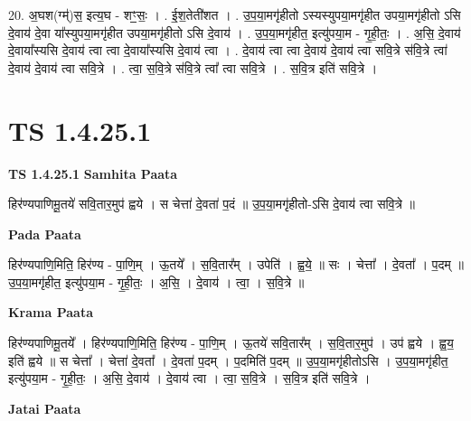 \documentclass[17pt]{extarticle}
\begin{document}
20. अ॒घश(ग्म्॑)स॒ इत्य॒घ - शꣳ॒॒सः॒ । . ई॒श॒तेती॑शत । . उ॒प॒या॒मगृ॑हीतो ऽस्यस्युपया॒मगृ॑हीत उपया॒मगृ॑हीतो ऽसि दे॒वाय॑ दे॒वा या᳚स्युपया॒मगृ॑हीत उपया॒मगृ॑हीतो ऽसि दे॒वाय॑ । . उ॒प॒या॒मगृ॑हीत॒ इत्यु॑पया॒म - गृ॒ही॒तः॒ । . अ॒सि॒ दे॒वाय॑ दे॒वाया᳚स्यसि दे॒वाय॑ त्वा त्वा दे॒वाया᳚स्यसि दे॒वाय॑ त्वा । . दे॒वाय॑ त्वा त्वा दे॒वाय॑ दे॒वाय॑ त्वा सवि॒त्रे स॑वि॒त्रे त्वा॑ दे॒वाय॑ दे॒वाय॑ त्वा सवि॒त्रे । . त्वा॒ स॒वि॒त्रे स॑वि॒त्रे त्वा᳚ त्वा सवि॒त्रे । . स॒वि॒त्र इति॑ सवि॒त्रे । \newline
\pagebreak
{}
\section*{ TS 1.4.25.1 }

\textbf{TS 1.4.25.1 } \newline
\textbf{Samhita Paata} \newline

हिर॑ण्यपाणिमू॒तये॑ सवि॒तार॒मुप॑ ह्वये । स चेत्ता॑ दे॒वता॑ प॒दं ॥ उ॒प॒या॒मगृ॑हीतो-ऽसि दे॒वाय॑ त्वा सवि॒त्रे ॥ \newline

\textbf{Pada Paata} \newline

हिर॑ण्यपाणि॒मिति॒ हिर॑ण्य - पा॒णि॒म् । ऊ॒तये᳚ । स॒वि॒तार᳚म् । उपेति॑ । ह्व॒ये॒ ॥ सः । चेत्ता᳚ । दे॒वता᳚ । प॒दम् ॥ उ॒प॒या॒मगृ॑हीत॒ इत्यु॑पया॒म - गृ॒ही॒तः॒ । अ॒सि॒ । दे॒वाय॑ । त्वा॒ । स॒वि॒त्रे ॥  \newline


\textbf{Krama Paata} \newline

हिर॑ण्यपाणिमू॒तये᳚ । हिर॑ण्यपाणि॒मिति॒ हिर॑ण्य - पा॒णि॒म् । ऊ॒तये॑ सवि॒तार᳚म् । स॒वि॒तार॒मुप॑ । उप॑ ह्वये । ह्व॒य॒ इति॑ ह्वये ॥ स चेत्ता᳚ । चेत्ता॑ दे॒वता᳚ । दे॒वता॑ प॒दम् । प॒दमिति॑ प॒दम् ॥ उ॒प॒या॒मगृ॑हीतोऽसि । उ॒प॒या॒मगृ॑हीत॒ इत्यु॑पया॒म - गृ॒ही॒तः॒ । अ॒सि॒ दे॒वाय॑ । दे॒वाय॑ त्वा । त्वा॒ स॒वि॒त्रे । स॒वि॒त्र इति॑ सवि॒त्रे । \newline

\textbf{Jatai Paata} \newline
\end{document}
